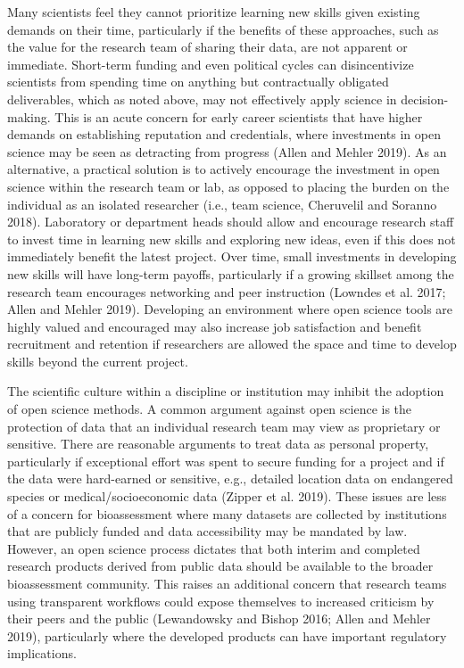 \documentclass[fleqn,10pt,lineno]{wlpeerj} %
\begin{document}
Many scientists feel they cannot prioritize learning new skills given existing demands on their time, particularly if the benefits of these approaches, such as the value for the research team of sharing their data, are not apparent or immediate. Short-term funding and even political cycles can disincentivize scientists from spending time on anything but contractually obligated deliverables, which as noted above, may not effectively apply science in decision-making. This is an acute concern for early career scientists that have higher demands on establishing reputation and credentials, where investments in open science may be seen as detracting from progress (Allen and Mehler 2019). As an alternative, a practical solution is to actively encourage the investment in open science within the research team or lab, as opposed to placing the burden on the individual as an isolated researcher (i.e., team science, Cheruvelil and Soranno 2018). Laboratory or department heads should allow and encourage research staff to invest time in learning new skills and exploring new ideas, even if this does not immediately benefit the latest project. Over time, small investments in developing new skills will have long-term payoffs, particularly if a growing skillset among the research team encourages networking and peer instruction (Lowndes et al. 2017; Allen and Mehler 2019). Developing an environment where open science tools are highly valued and encouraged may also increase job satisfaction and benefit recruitment and retention if researchers are allowed the space and time to develop skills beyond the current project.

The scientific culture within a discipline or institution may inhibit the adoption of open science methods. A common argument against open science is the protection of data that an individual research team may view as proprietary or sensitive. There are reasonable arguments to treat data as personal property, particularly if exceptional effort was spent to secure funding for a project and if the data were hard-earned or sensitive, e.g., detailed location data on endangered species or medical/socioeconomic data (Zipper et al. 2019). These issues are less of a concern for bioassessment where many datasets are collected by institutions that are publicly funded and data accessibility may be mandated by law. However, an open science process dictates that both interim and completed research products derived from public data should be available to the broader bioassessment community. This raises an additional concern that research teams using transparent workflows could expose themselves to increased criticism by their peers and the public (Lewandowsky and Bishop 2016; Allen and Mehler 2019), particularly where the developed products can have important regulatory implications.
\end{document}
